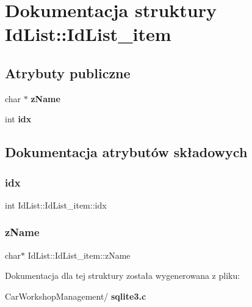 \section{Dokumentacja struktury Id\+List\+::Id\+List\+\_\+item}
\label{struct_id_list_1_1_id_list__item}
\subsection*{Atrybuty publiczne}
\begin{DoxyCompactItemize}
\item 
char $\ast$ \textbf{ z\+Name}
\item 
int \textbf{ idx}
\end{DoxyCompactItemize}


\subsection{Dokumentacja atrybutów składowych}
\mbox{\label{struct_id_list_1_1_id_list__item_a869d1a5ee03bcb018e38fae6c9ac0572}} 
\subsubsection{idx}
{\footnotesize\ttfamily int Id\+List\+::\+Id\+List\+\_\+item\+::idx}

\mbox{\label{struct_id_list_1_1_id_list__item_acd44e1182dc46441939cd6a5d935724c}} 
\subsubsection{zName}
{\footnotesize\ttfamily char$\ast$ Id\+List\+::\+Id\+List\+\_\+item\+::z\+Name}



Dokumentacja dla tej struktury została wygenerowana z pliku\+:\begin{DoxyCompactItemize}
\item 
Car\+Workshop\+Management/\textbf{ sqlite3.\+c}\end{DoxyCompactItemize}
